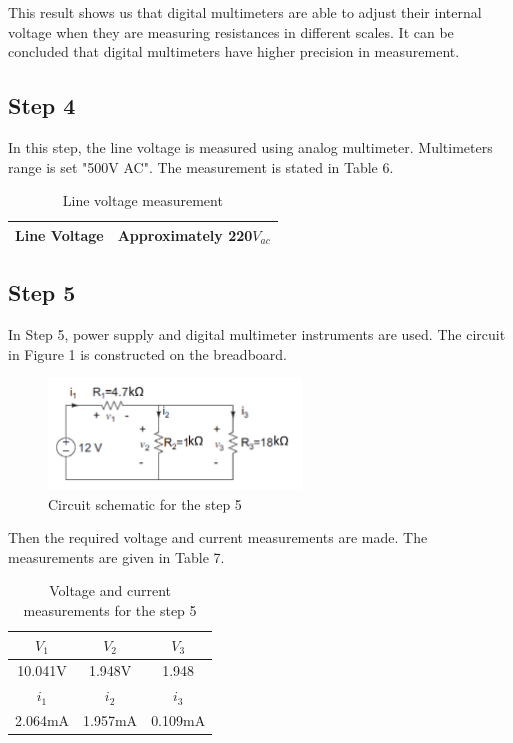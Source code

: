\documentclass[letterpaper,12pt]{article}
\begin{document}
This result shows us that digital multimeters are able to adjust their internal voltage when they are measuring resistances in different scales. It can be concluded that digital multimeters have higher precision in measurement.

\subsection{Step 4}
In this step, the line voltage is measured using analog multimeter. Multimeters range is set "500V AC". The measurement is stated in Table 6.
\begin{table}[H]
	\begin{center}
		\begin{tabular}{|| c | c ||} 
		 \hline
		 Line Voltage & Approximately 220\(V_{ac}\) 		 \\ [0.5ex] 
		
		 \hline
		\end{tabular}
	\end{center}
	\caption{Line voltage measurement }
\end{table}

\subsection{Step 5}
In Step 5, power supply and digital multimeter instruments are used. The circuit in Figure 1 is constructed on the breadboard. 
\begin{figure}[H]
	\caption{Circuit schematic for the step 5}
	\centering
	\includegraphics[width=0.6\textwidth]{5.png}
\end{figure} 
Then the required voltage and current measurements are made. The measurements are given in Table 7.
\begin{table}[H]
	\centering
	\begin{tabular}{|| c | c | c ||}
		\hline
	\(V_1\) & \(V_2\) & \(V_3\) \\
	\hline
	10.041V & 1.948V & 1.948 \\
	\hline\hline
	\(i_1\) & \(i_2\) & \(i_3\) \\
	\hline
	2.064mA & 1.957mA & 0.109mA\\
	\hline
	\end{tabular}
	\caption{Voltage and current measurements for the step 5}
	
	\end{table}
\end{document}
